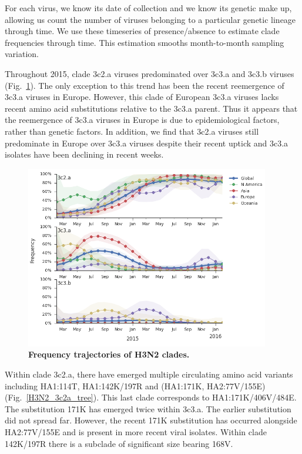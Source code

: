 \documentclass[11pt,oneside,letterpaper]{article}
\begin{document}
For each virus, we know its date of collection and we know its genetic make up, allowing us count the number of viruses belonging to a particular genetic lineage through time. We use these timeseries of presence/absence to estimate clade frequencies through time. This estimation smooths month-to-month sampling variation.

Throughout 2015, clade 3c2.a viruses predominated over 3c3.a and 3c3.b viruses (Fig.\ \ref{H3N2_clades}). The only exception to this trend has been the recent reemergence of 3c3.a viruses in Europe. However, this clade of European 3c3.a viruses lacks recent amino acid substitutions relative to the 3c3.a parent. Thus it appears that the reemergence of 3c3.a viruses in Europe is due to epidemiological factors, rather than genetic factors. In addition, we find that 3c2.a viruses still predominate in Europe over 3c3.a viruses despite their recent uptick and 3c3.a isolates have been declining in recent weeks.

\begin{figure}[h!]
	\centering		
	\includegraphics[width=0.95\textwidth]{../figures/feb-2016/H3N2_clades.png}
	\caption{\textbf{Frequency trajectories of H3N2 clades.} 
	}
	\label{H3N2_clades}
\end{figure}

Within clade 3c2.a, there have emerged multiple circulating amino acid variants including HA1:114T, HA1:142K/197R and (HA1:171K, HA2:77V/155E) (Fig.\ \ref{H3N2_3c2a_tree}). This last clade corresponds to HA1:171K/406V/484E. The substitution 171K has emerged twice within 3c3.a. The earlier substitution did not spread far. However, the recent 171K substitution has occurred alongside HA2:77V/155E and is present in more recent viral isolates. Within clade 142K/197R there is a subclade of significant size bearing 168V.
\end{document}
